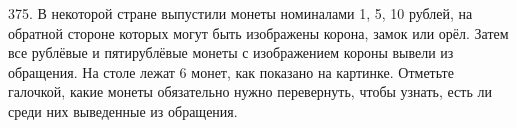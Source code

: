 375. В некоторой стране выпустили монеты номиналами 1, 5, 10 рублей, на обратной стороне которых
могут быть изображены корона, замок или орёл. Затем все рублёвые и пятирублёвые монеты с
изображением короны вывели из обращения. На столе лежат 6 монет, как показано на картинке.
Отметьте галочкой, какие монеты обязательно нужно перевернуть, чтобы узнать, есть ли среди них
выведенные из обращения.\\
\begin{figure}[ht!]
\end{figure}\\
